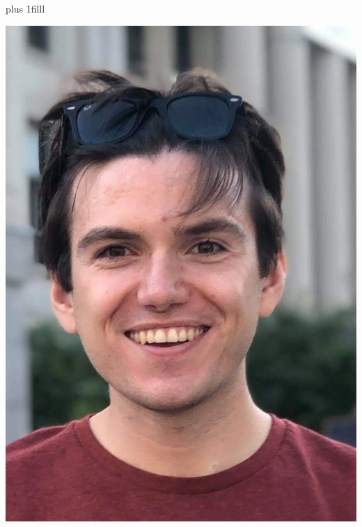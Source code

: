 \documentclass{photobook} %
\begin{document}
\maketitle
\pagestyle{empty}
\begin{minipage}{\imgwidth}%
\drawtrimcorners%
\vskip0pt plus 1filll
\begin{minipage}{\imgwidth}%
 \hfil\includegraphics[width=\imgwidth,height=\imgheight,keepaspectratio]{profile-image.webp}\hfil
\end{minipage}
\end{minipage}
\newpage
\end{document}
